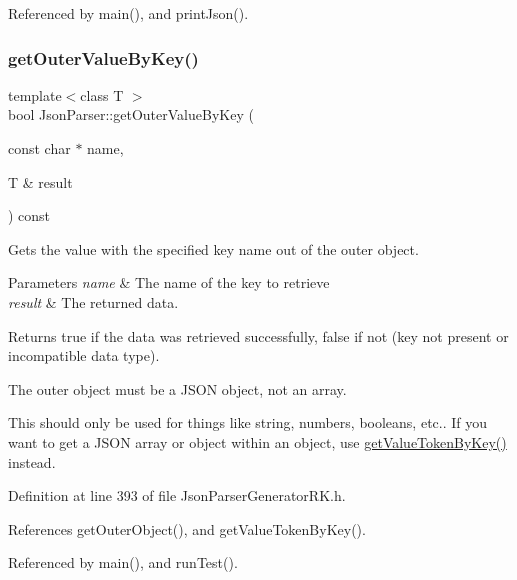 Referenced by main(), and print\+Json().

\mbox{\label{class_json_parser_a38858994342cd2735b716b117bf8afdf}} 
\subsubsection{\texorpdfstring{get\+Outer\+Value\+By\+Key()}{getOuterValueByKey()}}
{\footnotesize\ttfamily template$<$class T $>$ \\
bool Json\+Parser\+::get\+Outer\+Value\+By\+Key (\begin{DoxyParamCaption}\item[{const char $\ast$}]{name,  }\item[{T \&}]{result }\end{DoxyParamCaption}) const\hspace{0.3cm}{\ttfamily [inline]}}



Gets the value with the specified key name out of the outer object. 


\begin{DoxyParams}{Parameters}
{\em name} & The name of the key to retrieve\\
\hline
{\em result} & The returned data.\\
\hline
\end{DoxyParams}
\begin{DoxyReturn}{Returns}
true if the data was retrieved successfully, false if not (key not present or incompatible data type).
\end{DoxyReturn}
The outer object must be a J\+S\+ON object, not an array.

This should only be used for things like string, numbers, booleans, etc.. If you want to get a J\+S\+ON array or object within an object, use \hyperlink{class_json_parser_a39d613e94d0d6beafe908159f86bc067}{get\+Value\+Token\+By\+Key()} instead. 

Definition at line 393 of file Json\+Parser\+Generator\+R\+K.\+h.



References get\+Outer\+Object(), and get\+Value\+Token\+By\+Key().



Referenced by main(), and run\+Test().

